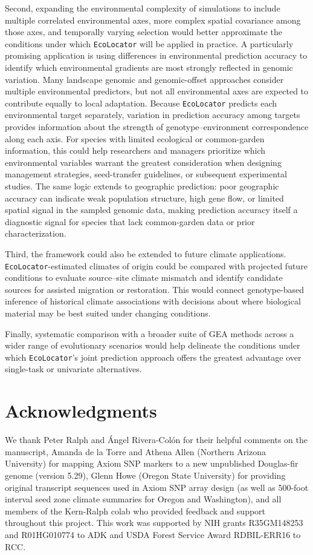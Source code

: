 \documentclass[]{article}
\newcommand{\dfir}{Douglas-fir\xspace}
\newcommand{\ecolocator}{\texttt{EcoLocator}\xspace}
\begin{document}
Second, expanding the environmental complexity
of simulations to include multiple correlated environmental axes,
more complex spatial covariance among those axes,
and temporally varying selection would
better approximate the conditions
under which \ecolocator will be applied in practice. 
A particularly promising application is using 
differences in environmental prediction accuracy
to identify which environmental gradients
are most strongly reflected in genomic variation.
Many landscape genomic and genomic-offset approaches
consider multiple environmental predictors,
but not all environmental axes are expected
to contribute equally to local adaptation.
Because \ecolocator predicts each environmental target separately,
variation in prediction accuracy among targets
provides information about the strength
of genotype--environment correspondence along each axis.
For species with limited ecological or common-garden information,
this could help researchers and managers prioritize
which environmental variables warrant the greatest consideration
when designing management strategies,
seed-transfer guidelines,
or subsequent experimental studies. The same logic extends to geographic
prediction: poor geographic accuracy can indicate weak population
structure, high gene flow, or limited spatial signal in the sampled
genomic data, making prediction accuracy itself a diagnostic signal
for species that lack common-garden data or prior characterization.

Third, the framework could also be extended
to future climate applications.
\ecolocator-estimated climates of origin could be compared
with projected future conditions
to evaluate source--site climate mismatch and 
identify candidate sources 
for assisted migration or restoration.
This would connect genotype-based inference
of historical climate associations
with decisions about where biological material
may be best suited under changing conditions. 

Finally, systematic comparison
with a broader suite of GEA methods
across a wider range of evolutionary scenarios
would help delineate the conditions
under which \ecolocator's joint prediction approach
offers the greatest advantage
over single-task or univariate alternatives.

\section{Acknowledgments}
We thank Peter Ralph and \'Angel Rivera-Col\'on for their helpful comments on the manuscript,
Amanda de la Torre and Athena Allen (Northern Arizona University) for mapping Axiom SNP markers 
to a new unpublished \dfir{} genome (version 5.29), Glenn Howe (Oregon State University) for providing 
original transcript sequences used in Axiom SNP array design (as well as 500-foot interval seed zone 
climate summaries for Oregon and Washington),
and all members of the Kern-Ralph colab who provided feedback and support throughout this project.
This work was supported by NIH grants R35GM148253 and R01HG010774 to ADK and 
USDA Forest Service Award RDBIL-ERR16 to RCC.
\end{document}
